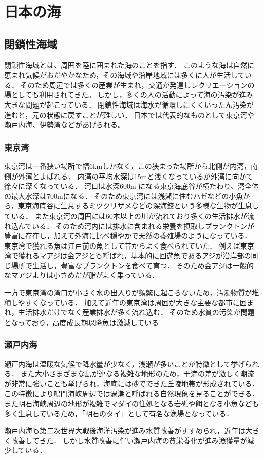 \documentclass[12pt,a4j,titlepage]{ltjsarticle}
\begin{document}
\section{日本の海}\label{海}
\subsection{閉鎖性海域}
閉鎖性海域とは、周囲を陸に囲まれた海のことを指す．
このような海は自然に恵まれ気候がおだやかなため，その海域や沿岸地域には多くに人が生活している．
そのため周辺では多くの産業が生まれ，交通が発達しレクリエーションの場としても利用されてきた。
しかし，多くの人の活動によって海の汚染が進み大きな問題が起こっている．
閉鎖性海域は海水が循環しにくくいったん汚染が進むと，元の状態に戻すことが難しい．
日本では代表的なものとして東京湾や瀬戸内海、伊勢湾などがあげられる。
\subsubsection{東京湾}
東京湾は一番狭い場所で幅6kmしかなく，この狭まった場所から北側が内湾，南側が外湾とよばれる\cite{toukyouwan}．
内湾の平均水深は15mと浅くなっているが外湾に向かて徐々に深くなっている．
湾口は水深600m になる東京海底谷が横たわり、湾全体の最大水深は700mになる．
そのため東京湾には浅瀬に住むハゼなどの小魚から，東京海底谷に生息するミツクリザメなどの深海鮫という多様な生物が生息している．
また東京湾の周囲には60本以上の川が流れており多くの生活排水が流れ込んでいる．
そのため湾内には排水に含まれる栄養を摂取しプランクトンが豊富に存在し，加えて外海に比べ穏やかで天然の養殖場のようになっている．
東京湾で獲れる魚は江戸前の魚として昔からよく食べられていた．
例えば東京湾で獲れるマアジは金アジとも呼ばれ，基本的に回遊魚であるアジが沿岸部の同じ場所で生活し，豊富なプランクトンを食べて育つ．
そのため金アジは一般的なマアジよりは小さめだが脂がよく乗っている\cite{toyoumi}．\par
一方で東京湾の湾口が小さく水の出入りが頻繁に起こらないため，汚濁物質が堆積しやすくなっている．
加えて近年の東京湾は周囲が大きな主要な都市に囲まれ，生活排水だけでなく産業排水が多く流れ込む．
そのため水質の汚染が問題となっており，高度成長期以降魚は激減している
\subsubsection{瀬戸内海}
瀬戸内海は温暖な気候で降水量が少なく，浅瀬が多いことが特徴として挙げられる．
また大小さまざまな島が連なる複雑な地形のため，干満の差が激しく潮流が非常に強いことも挙げられ，海底には砂でできた丘陵地帯が形成されている．
この特徴により鳴門海峡周辺では渦潮と呼ばれる自然現象を見ることができる．
また明石海峡周辺の地形が複雑でマダイの住処となる岩礁や餌となる小魚なども多く生息しているため，「明石のタイ」として有名な漁場となっている．\par
瀬戸内海も第二次世界大戦後海洋汚染が進み水質改善がすすめられ，近年は大きく改善してきた\cite{setouti}．
しかし水質改善に伴い瀬戸内海の貧栄養化が進み漁獲量が減少している．
\end{document}
